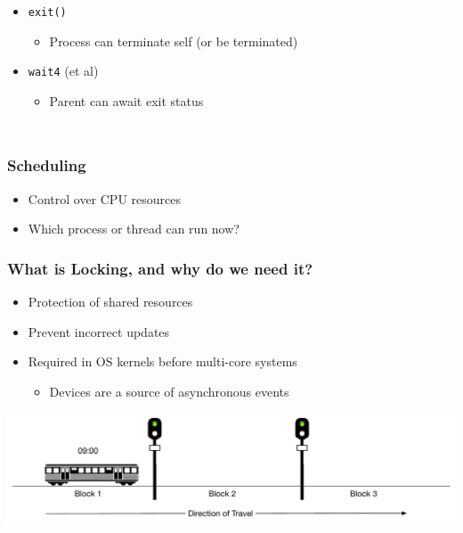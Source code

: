 \documentclass[pdftex]{beamer} %
\begin{document}
\begin{frame}
\begin{columns}[T]
\begin{itemize}
      \pause

      \item \texttt{exit()}
      \begin{itemize}
	\item Process can terminate self (or be terminated)
      \end{itemize}

      \pause

      \item \texttt{wait4} (et al)
      \begin{itemize}
	\item Parent can await exit status
      \end{itemize}
    \end{itemize}
  \end{columns}
\end{frame}

\begin{frame}
  \frametitle{Scheduling}
  \begin{itemize}
  \item Control over CPU resources
  \item Which process or thread can run now?
  \end{itemize}
\end{frame}

\begin{frame}
  \frametitle{What is Locking, and why do we need it?}
  \begin{itemize}
  \item Protection of shared resources
  \item Prevent incorrect updates
  \item Required in OS kernels before multi-core systems
    \begin{itemize}
    \item Devices are a source of asynchronous events
    \end{itemize}
  \end{itemize}
\end{frame}

\begin{frame}
      \includegraphics[width=\textwidth]{../../figures/block-signaling-1.pdf}
\end{frame}
\end{document}
